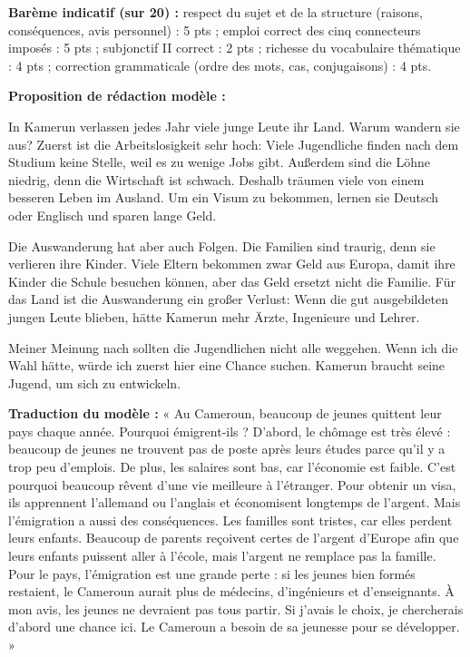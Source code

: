 \documentclass[11pt]{article}
\begin{document}
\begin{corrige}
\textbf{Barème indicatif (sur 20) :} respect du sujet et de la structure (raisons, conséquences, avis personnel) : 5 pts ; emploi correct des cinq connecteurs imposés : 5 pts ; subjonctif II correct : 2 pts ; richesse du vocabulaire thématique : 4 pts ; correction grammaticale (ordre des mots, cas, conjugaisons) : 4 pts.

\textbf{Proposition de rédaction modèle :}

\begin{textebox}
In Kamerun verlassen jedes Jahr viele junge Leute ihr Land. Warum wandern sie aus? Zuerst ist die Arbeitslosigkeit sehr hoch: Viele Jugendliche finden nach dem Studium keine Stelle, weil es zu wenige Jobs gibt. Außerdem sind die Löhne niedrig, denn die Wirtschaft ist schwach. Deshalb träumen viele von einem besseren Leben im Ausland. Um ein Visum zu bekommen, lernen sie Deutsch oder Englisch und sparen lange Geld.

Die Auswanderung hat aber auch Folgen. Die Familien sind traurig, denn sie verlieren ihre Kinder. Viele Eltern bekommen zwar Geld aus Europa, damit ihre Kinder die Schule besuchen können, aber das Geld ersetzt nicht die Familie. Für das Land ist die Auswanderung ein großer Verlust: Wenn die gut ausgebildeten jungen Leute blieben, hätte Kamerun mehr Ärzte, Ingenieure und Lehrer.

Meiner Meinung nach sollten die Jugendlichen nicht alle weggehen. Wenn ich die Wahl hätte, würde ich zuerst hier eine Chance suchen. Kamerun braucht seine Jugend, um sich zu entwickeln.
\end{textebox}

\textbf{Traduction du modèle :} « Au Cameroun, beaucoup de jeunes quittent leur pays chaque année. Pourquoi émigrent-ils ? D'abord, le chômage est très élevé : beaucoup de jeunes ne trouvent pas de poste après leurs études parce qu'il y a trop peu d'emplois. De plus, les salaires sont bas, car l'économie est faible. C'est pourquoi beaucoup rêvent d'une vie meilleure à l'étranger. Pour obtenir un visa, ils apprennent l'allemand ou l'anglais et économisent longtemps de l'argent. Mais l'émigration a aussi des conséquences. Les familles sont tristes, car elles perdent leurs enfants. Beaucoup de parents reçoivent certes de l'argent d'Europe afin que leurs enfants puissent aller à l'école, mais l'argent ne remplace pas la famille. Pour le pays, l'émigration est une grande perte : si les jeunes bien formés restaient, le Cameroun aurait plus de médecins, d'ingénieurs et d'enseignants. À mon avis, les jeunes ne devraient pas tous partir. Si j'avais le choix, je chercherais d'abord une chance ici. Le Cameroun a besoin de sa jeunesse pour se développer. »


\end{corrige}
\end{document}
